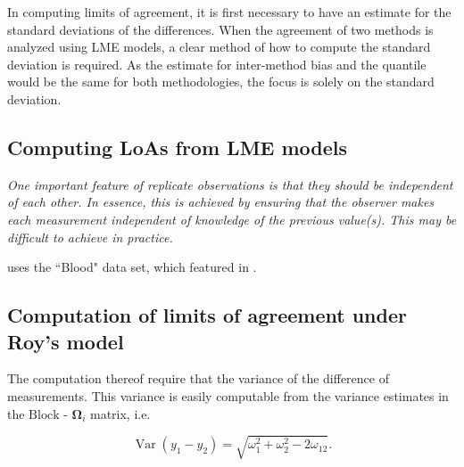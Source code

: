 \documentclass[12pt, a4paper]{report}
\theoremstyle{plain}
\theoremstyle{definition}
\theoremstyle{remark}
\begin{document}
\newpage

In computing limits of agreement, it is first necessary to have an estimate for the standard deviations of the differences. When the agreement of two methods is analyzed using LME models, a clear method of how to compute the standard deviation is required. As the estimate for inter-method bias and the quantile would be the same for both methodologies, the focus is solely on the standard deviation.
\subsection{Computing LoAs from LME models}

\emph{
	One important feature of replicate observations is that they should be independent
	of each other. In essence, this is achieved by ensuring that the observer makes each
	measurement independent of knowledge of the previous value(s). This may be difficult
	to achieve in practice.}








\citet{Roy2006} uses the ``Blood" data set, which featured in \citet{BA99}.








\subsection{Computation of limits of agreement under Roy's model}

The computation thereof require that the variance of the difference of measurements. This variance is easily computable from the  variance estimates in the ${\mbox{Block - }\boldsymbol \Omega_{i}}$ matrix, i.e.


\[
\operatorname{Var}(y_1 - y_2) = \sqrt{ \omega^2_1 + \omega^2_2 - 2\omega_{12}}.
\]


\end{document}
